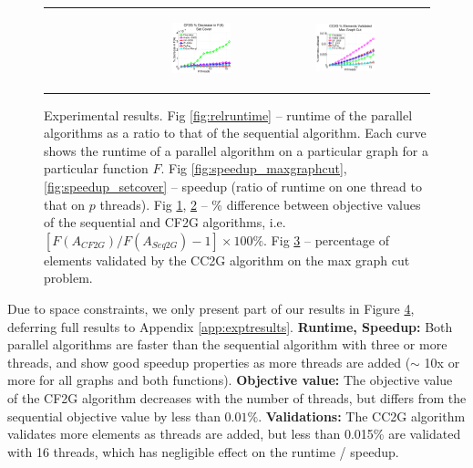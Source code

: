 \documentclass{article} %
\newcommand{\hogwild}{CF2G}
\newcommand{\occ}{CC2G}
\newcommand{\seqalg}{Seq2G}
\begin{document}
\begin{figure}[ht]
\begin{tabular}{cccc}
\begin{subfigure}[h]{0.30\textwidth}
			\caption{}
			\label{fig:difffa_maxgraphcut}
	  \end{subfigure} &
	  \begin{subfigure}[h]{0.30\textwidth}
	  	\includegraphics[width=130pt]{images/summary_diffFA_setcover.pdf}
			\caption{}
			\label{fig:difffa_setcover}
	  \end{subfigure} &
	  \begin{subfigure}[h]{0.30\textwidth}
	  	\includegraphics[width=130pt]{images/summary_validated_maxgraphcut.pdf}
			\caption{}
			\label{fig:validated_maxgraphcut}
	  \end{subfigure} \\
  \end{tabular}
  \caption{\footnotesize Experimental results.
  Fig \ref{fig:relruntime} -- runtime of the parallel algorithms as a ratio to that of the sequential algorithm. Each curve shows the runtime of a parallel algorithm on a particular graph for a particular function $F$.
  Fig \ref{fig:speedup_maxgraphcut}, \ref{fig:speedup_setcover} -- speedup (ratio of runtime on one thread to that on $p$ threads).
  Fig \ref{fig:difffa_maxgraphcut}, \ref{fig:difffa_setcover} -- \% difference between objective values of the sequential and \hogwild{} algorithms, i.e. $[F(A_{\hogwild{}}) / F(A_{\seqalg}) - 1] \times 100\%$.
  Fig \ref{fig:validated_maxgraphcut} -- percentage of elements validated by the \occ{} algorithm on the max graph cut problem.
  }
\label{fig:results_quality}
\end{figure}


Due to space constraints, we only present part of our results in Figure \ref{fig:results_quality}, deferring full results to Appendix \ref{app:exptresults}.
\textbf{Runtime, Speedup:} Both parallel algorithms are faster than the sequential algorithm with three or more threads, and show good speedup properties as more threads are added ($\sim$ 10x or more for all graphs and both functions).
\textbf{Objective value:} The objective value of the \hogwild{} algorithm decreases with the number of threads, but differs from the sequential objective value by less than $0.01\%$.
\textbf{Validations:} The \occ{} algorithm validates more elements as threads are added, but less than 0.015\% are validated with 16 threads, which has negligible effect on the runtime / speedup.
\end{document}
